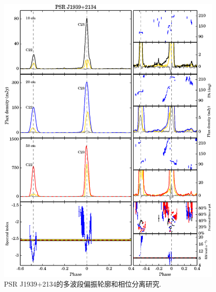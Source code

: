 \begin{figure}
\begin{center}
\includegraphics[width=6 in]{1939.ps}
\caption{PSR J1939$+$2134的多波段偏振轮廓和相位分离研究.}
\label{1939}
\end{center}
\end{figure}

